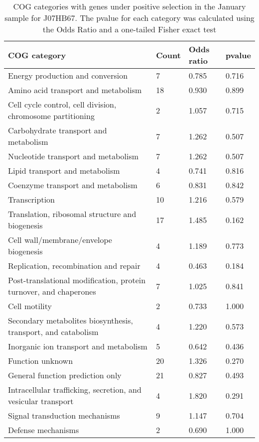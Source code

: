 \begin{table}[]
\footnotesize 
	\tabcolsep=0.11cm 
\caption{COG categories with genes under positive selection in the January sample for J07HB67. The pvalue for each category was calculated using the Odds Ratio and a one-tailed Fisher exact test \\} 
\begin{tabularx}{\textwidth}{L{6cm}R{2cm}R{2cm}R{2cm}} 
\hline 
\textbf{COG category} & \textbf{Count} & \textbf{Odds ratio} & \textbf{pvalue} \\ 
\hline 
Energy production and conversion & 7 & 0.785 & 0.716 \\ 
Amino acid transport and metabolism & 18 & 0.930 & 0.899 \\ 
Cell cycle control, cell division, chromosome partitioning & 2 & 1.057 & 0.715 \\ 
Carbohydrate transport and metabolism & 7 & 1.262 & 0.507 \\ 
Nucleotide transport and metabolism & 7 & 1.262 & 0.507 \\ 
Lipid transport and metabolism & 4 & 0.741 & 0.816 \\ 
Coenzyme transport and metabolism & 6 & 0.831 & 0.842 \\ 
Transcription & 10 & 1.216 & 0.579 \\ 
Translation, ribosomal structure and biogenesis & 17 & 1.485 & 0.162 \\ 
Cell wall/membrane/envelope biogenesis & 4 & 1.189 & 0.773 \\ 
Replication, recombination and repair & 4 & 0.463 & 0.184 \\ 
Post-translational modification, protein turnover, and chaperones & 7 & 1.025 & 0.841 \\ 
Cell motility & 2 & 0.733 & 1.000 \\ 
Secondary metabolites biosynthesis, transport, and catabolism & 4 & 1.220 & 0.573 \\ 
Inorganic ion transport and metabolism & 5 & 0.642 & 0.436 \\ 
Function unknown & 20 & 1.326 & 0.270 \\ 
General function prediction only & 21 & 0.827 & 0.493 \\ 
Intracellular trafficking, secretion, and vesicular transport & 4 & 1.820 & 0.291 \\ 
Signal transduction mechanisms & 9 & 1.147 & 0.704 \\ 
Defense mechanisms & 2 & 0.690 & 1.000 \\ 
\end{tabularx} 
\label{January_COG_Selection_J07HB67} 
 \end{table} 

